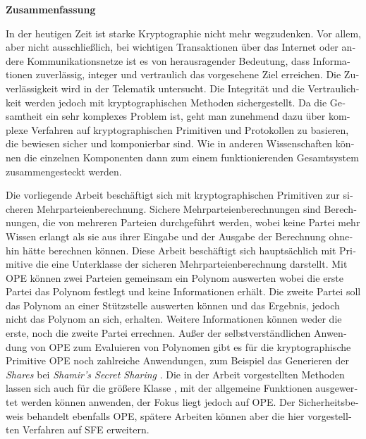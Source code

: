 \noindent{}\textsf{\textbf{\huge Zusammenfassung}}

\bigskip{}

\begin{otherlanguage}{ngerman}

\noindent{}In der heutigen Zeit ist starke Kryptographie nicht mehr wegzudenken.
Vor allem, aber nicht ausschließlich, bei wichtigen Transaktionen über das
Internet oder andere Kommunikationsnetze ist es von herausragender Bedeutung,
dass Informationen zuverlässig, integer und vertraulich das vorgesehene Ziel
erreichen. Die Zuverlässigkeit wird in der Telematik untersucht. Die Integrität
und die Vertraulichkeit werden jedoch mit kryptographischen Methoden
sichergestellt. Da die Gesamtheit ein sehr komplexes Problem ist, geht man
zunehmend dazu über komplexe Verfahren auf kryptographischen Primitiven und
Protokollen zu basieren, die bewiesen sicher und komponierbar sind. Wie in
anderen Wissenschaften können die einzelnen Komponenten dann zum einem
funktionierenden Gesamtsystem zusammengesteckt werden.

Die vorliegende Arbeit beschäftigt sich mit kryptographischen Primitiven zur
sicheren Mehrparteienberechnung. Sichere Mehrparteienberechnungen sind
Berechnungen, die von mehreren Parteien durchgeführt werden, wobei keine Partei
mehr Wissen erlangt als sie aus ihrer Eingabe und der Ausgabe der Berechnung
ohnehin hätte berechnen können. Diese Arbeit beschäftigt sich hauptsächlich mit
Primitive  die eine Unterklasse
der sicheren Mehrparteienberechnung darstellt. Mit OPE können zwei Parteien
gemeinsam ein Polynom auswerten wobei die erste Partei das Polynom festlegt und
keine Informationen erhält. Die zweite Partei soll das Polynom an einer
Stützstelle auswerten können und das Ergebnis, jedoch nicht das Polynom an sich,
erhalten. Weitere Informationen können weder die erste, noch die zweite Partei
errechnen. Außer der selbstverständlichen Anwendung von OPE zum Evaluieren von
Polynomen gibt es für die kryptographische Primitive OPE noch zahlreiche
Anwendungen, zum Beispiel das Generieren der \emph{Shares} bei \emph{Shamir's
Secret Sharing} \cite{shamir79}. Die in der Arbeit vorgestellten Methoden lassen
sich auch für die größere Klasse , mit
der allgemeine Funktionen ausgewertet werden können anwenden, der Fokus liegt
jedoch auf OPE. Der Sicherheitsbeweis behandelt ebenfalls OPE, spätere Arbeiten
können aber die hier vorgestellten Verfahren auf SFE erweitern.


\end{otherlanguage}
